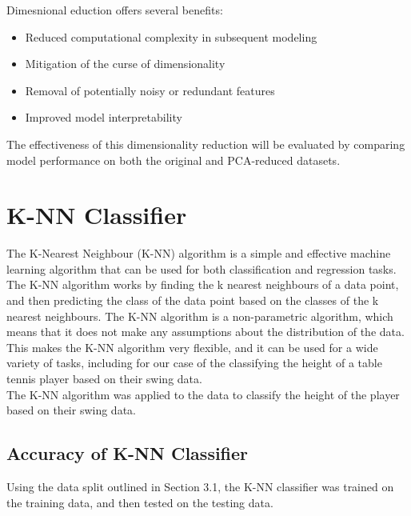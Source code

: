 \documentclass[12pt]{article}
\begin{document}
Dimesnional eduction offers several benefits:

\begin{itemize}
    \item Reduced computational complexity in subsequent modeling
    \item Mitigation of the curse of dimensionality
    \item Removal of potentially noisy or redundant features
    \item Improved model interpretability
\end{itemize}

The effectiveness of this dimensionality reduction will be evaluated by comparing model performance on both the original and PCA-reduced datasets.

\vspace{20pt}

\section{K-NN Classifier}
\noindent
The K-Nearest Neighbour (K-NN) algorithm is a simple and effective machine learning algorithm that can be used for both classification and regression tasks. The K-NN algorithm works by finding the k nearest neighbours of a data point, and then predicting the class of the data point based on the classes of the k nearest neighbours. The K-NN algorithm is a non-parametric algorithm, which means that it does not make any assumptions about the distribution of the data. This makes the K-NN algorithm very flexible, and it can be used for a wide variety of tasks, including for our case of the classifying the height of a table tennis player based on their swing data.
\\
The K-NN algorithm was applied to the data to classify the height of the player based on their swing data.


\vspace{20pt}


\subsection{Accuracy of K-NN Classifier}
\noindent
Using the data split outlined in Section 3.1, the K-NN classifier was trained on the training data, and then tested on the testing data. 
\end{document}

